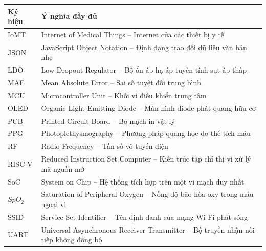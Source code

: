 {\newpage

\begin{center}
\renewcommand{\arraystretch}{1.2}
\begin{tabular}{|l|l|}
\hline
\textbf{Ký hiệu} & \textbf{Ý nghĩa đầy đủ} \\ \hline
IoMT & \parbox[t]{11cm}{\raggedright Internet of Medical Things -- Internet của các thiết bị y tế} \\ \hline
JSON & \parbox[t]{11cm}{\raggedright JavaScript Object Notation -- Định dạng trao đổi dữ liệu văn bản nhẹ} \\ \hline
LDO & \parbox[t]{11cm}{\raggedright Low-Dropout Regulator -- Bộ ổn áp hạ áp tuyến tính sụt áp thấp} \\ \hline
MAE & \parbox[t]{11cm}{\raggedright Mean Absolute Error -- Sai số tuyệt đối trung bình} \\ \hline
MCU & \parbox[t]{11cm}{\raggedright Microcontroller Unit -- Khối vi điều khiển trung tâm} \\ \hline
OLED & \parbox[t]{11cm}{\raggedright Organic Light-Emitting Diode -- Màn hình diode phát quang hữu cơ} \\ \hline
PCB & \parbox[t]{11cm}{\raggedright Printed Circuit Board -- Bo mạch in vật lý} \\ \hline
PPG & \parbox[t]{11cm}{\raggedright Photoplethysmography -- Phương pháp quang học đo thể tích máu} \\ \hline
RF & \parbox[t]{11cm}{\raggedright Radio Frequency -- Tần số vô tuyến điện} \\ \hline
RISC-V & \parbox[t]{11cm}{\raggedright Reduced Instruction Set Computer -- Kiến trúc tập chỉ thị vi xử lý mã nguồn mở} \\ \hline
SoC & \parbox[t]{11cm}{\raggedright System on Chip -- Hệ thống tích hợp trên một vi mạch duy nhất} \\ \hline
$SpO_2$ & \parbox[t]{11cm}{\raggedright Saturation of Peripheral Oxygen -- Nồng độ bão hòa oxy trong máu ngoại vi} \\ \hline
SSID & \parbox[t]{11cm}{\raggedright Service Set Identifier -- Tên định danh của mạng Wi-Fi phát sóng} \\ \hline
UART & \parbox[t]{11cm}{\raggedright Universal Asynchronous Receiver-Transmitter -- Bộ truyền nhận nối tiếp không đồng bộ} \\ \hline
\end{tabular}
\end{center}
}

